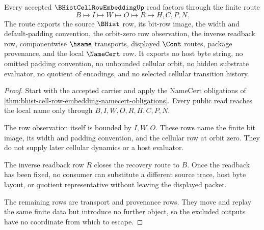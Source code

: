 \begin{theorem}
\label{thm:bhist-cell-row-embedding-nonescape}
Every accepted $\BHistCellRowEmbeddingUp$ read factors through the finite route
$$
B \longmapsto I \longmapsto W \longmapsto O \longmapsto R \longmapsto H,C,P,N.
$$
The route exports the source $\BHist$ row, its bit-row image, the width and default-padding convention, the orbit-zero row observation, the inverse readback row, componentwise $\hsame$ transports, displayed $\Cont$ routes, package provenance, and the local $\NameCert$ row. It exports no host byte string, no omitted padding convention, no unbounded cellular orbit, no hidden substrate evaluator, no quotient of encodings, and no selected cellular transition history.
\end{theorem}
\begin{proof}
Start with the accepted carrier and apply the NameCert obligations of \autoref{thm:bhist-cell-row-embedding-namecert-obligations}. Every public read reaches the local name only through $B,I,W,O,R,H,C,P,N$.

The row observation itself is bounded by $I,W,O$. These rows name the finite bit image, its width and padding convention, and the cellular row at orbit zero. They do not supply later cellular dynamics or a host evaluator.

The inverse readback row $R$ closes the recovery route to $B$. Once the readback has been fixed, no consumer can substitute a different source trace, host byte layout, or quotient representative without leaving the displayed packet.

The remaining rows are transport and provenance rows. They move and replay the same finite data but introduce no further object, so the excluded outputs have no coordinate from which to escape.
\end{proof}

